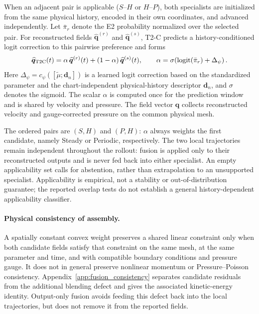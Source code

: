 \documentclass{article}
\begin{document}
When an adjacent pair is applicable ($S$--$H$ or $H$--$P$), both specialists are initialized from the same physical history, encoded in
their own coordinates, and advanced independently. Let $\bar\pi_r$ denote the E2 probability normalized over the selected pair. For reconstructed fields $\widehat{\bm q}^{(r)}$ and $\widehat{\bm q}^{(s)}$, T2-C predicts a history-conditioned logit correction to this pairwise preference and forms
\begin{equation}
  \widehat{\bm q}_{\rm T2C}(t)
  =\alpha\,\widehat{\bm q}^{(r)}(t)
  +(1-\alpha)\,\widehat{\bm q}^{(s)}(t),
  \qquad
  \alpha=
  \sigma\!\left(
  \operatorname{logit}(\bar\pi_r)+\Delta_\psi
  \right).
  \label{eq:main_t2c}
\end{equation}
Here $\Delta_\psi=c_\psi([\widetilde\mu;\bm d_n])$ is a learned logit correction based on the standardized parameter and the chart-independent physical-history descriptor $\bm d_n$, and $\sigma$ denotes the sigmoid. The scalar $\alpha$ is computed once for the prediction window and is shared by velocity and pressure. The field vector $\bm q$ collects reconstructed velocity and gauge-corrected pressure on the common physical mesh.

The ordered pairs are $(S,H)$ and $(P,H)$: $\alpha$ always weights the first candidate, namely Steady or Periodic, respectively. The two local trajectories remain independent throughout the rollout: fusion is applied only to their reconstructed outputs and is never fed back into either specialist. An empty applicability set calls for abstention, rather than extrapolation to an unsupported specialist. Applicability is empirical, not a stability or out-of-distribution guarantee; the reported overlap tests do not establish a general history-dependent applicability classifier.

\paragraph{Physical consistency of assembly.}
A spatially constant convex weight preserves a shared linear constraint only when both candidate fields satisfy that constraint on the same mesh, at the same parameter and time, and with compatible boundary conditions and pressure gauge. It does not in general preserve nonlinear momentum or Pressure--Poisson consistency. Appendix~\ref{app:fusion_consistency} separates candidate residuals from the additional blending defect and gives the associated kinetic-energy identity. Output-only fusion avoids feeding this defect back into the local trajectories, but does not remove it from the reported fields.
\end{document}
